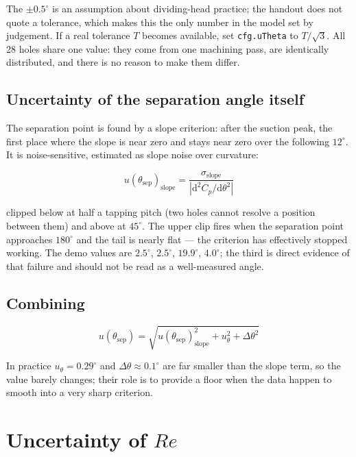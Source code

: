 \documentclass[11pt,a4paper]{article}
\newcommand{\Cp}{\ensuremath{C_p}}
\newcommand{\ReD}{\ensuremath{\mathit{Re}}}
\begin{document}
The $\pm0.5^\circ$ is an assumption about dividing-head practice; the handout does not quote a
tolerance, which makes this the only number in the model set by judgement. If a real tolerance
$T$ becomes available, set \texttt{cfg.uTheta} to $T/\sqrt{3}$. All 28 holes share one value: they
come from one machining pass, are identically distributed, and there is no reason to make them differ.

\subsection{Uncertainty of the separation angle itself}

The separation point is found by a slope criterion: after the suction peak, the first place where
the slope is near zero and stays near zero over the following $12^\circ$. It is noise-sensitive,
estimated as slope noise over curvature:

\begin{equation}
u(\theta_{\text{sep}})_{\text{slope}} = \frac{\sigma_{\text{slope}}}{|\mathrm{d}^2 \Cp/\mathrm{d}\theta^2|}
\end{equation}

clipped below at half a tapping pitch (two holes cannot resolve a position between them) and above
at $45^\circ$. The upper clip fires when the separation point approaches $180^\circ$ and the tail
is nearly flat --- the criterion has effectively stopped working. The demo values are
$2.5^\circ$, $2.5^\circ$, $19.9^\circ$, $4.0^\circ$; the third is direct evidence of that failure and
should not be read as a well-measured angle.

\subsection{Combining}

\begin{equation}
u(\theta_{\text{sep}}) = \sqrt{u(\theta_{\text{sep}})^2_{\text{slope}} + u_\theta^2 + \Delta\theta^2}
\end{equation}

In practice $u_\theta = 0.29^\circ$ and $\Delta\theta \approx 0.1^\circ$ are far smaller than the
slope term, so the value barely changes; their role is to provide a floor when the data happen to
smooth into a very sharp criterion.

\section{Uncertainty of \ReD}
\label{sec:re}
\end{document}
